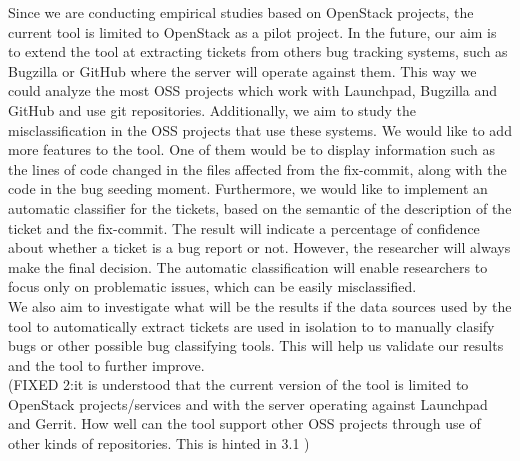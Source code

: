 \documentclass[runningheads,a4paper]{llncs}
\begin{document}
Since we are conducting empirical studies based on OpenStack projects, the current tool is limited to OpenStack as a pilot project. In the future, our aim is to extend the tool at extracting tickets from others bug tracking systems, such as Bugzilla or GitHub where the server will operate against them. This way we could analyze the most OSS projects which work with Launchpad, Bugzilla and GitHub and use git repositories. Additionally, we aim to study the misclassification in the OSS projects that use these systems. We would like to add more features to the tool. One of them would be to display information such as the lines of code changed in the files affected from the fix-commit, along with the code in the bug seeding moment. Furthermore, we would like to implement an automatic classifier for the tickets, based on the semantic of the description of the ticket and the fix-commit. The result will indicate a percentage of confidence about whether a ticket is a bug report or not. However, the researcher will always make the final decision. The automatic classification will enable researchers to focus only on problematic issues, which can be easily misclassified. \\

We also aim to investigate what will be the results if the data sources used by the tool to automatically extract tickets are used in isolation to to manually clasify bugs or other possible bug classifying tools. This will help us validate our results and the tool to further improve.\\

(FIXED 2:it is understood that the current version of the tool is limited to OpenStack projects/services and with the server operating against Launchpad and Gerrit. How well can the tool support other OSS projects through use of other kinds of repositories. This is hinted in 3.1 )\\
\end{document}

